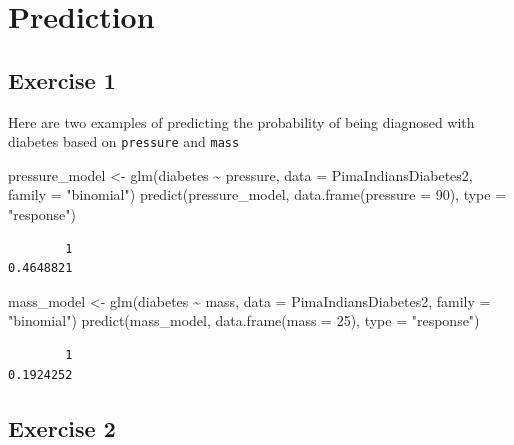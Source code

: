 \documentclass[
  letterpaper,
  DIV=11,
  numbers=noendperiod]{scrreprt}
\newenvironment{Shaded}{\begin{snugshade}}{\end{snugshade}}
\newcommand{\AttributeTok}[1]{\textcolor[rgb]{0.40,0.45,0.13}{#1}}
\newcommand{\DecValTok}[1]{\textcolor[rgb]{0.68,0.00,0.00}{#1}}
\newcommand{\FunctionTok}[1]{\textcolor[rgb]{0.28,0.35,0.67}{#1}}
\newcommand{\NormalTok}[1]{\textcolor[rgb]{0.00,0.23,0.31}{#1}}
\newcommand{\OtherTok}[1]{\textcolor[rgb]{0.00,0.23,0.31}{#1}}
\newcommand{\SpecialCharTok}[1]{\textcolor[rgb]{0.37,0.37,0.37}{#1}}
\newcommand{\StringTok}[1]{\textcolor[rgb]{0.13,0.47,0.30}{#1}}
\begin{document}
\section{Prediction}\label{prediction-4}

\subsection{Exercise 1}\label{exercise-1-33}

Here are two examples of predicting the probability of being diagnosed
with diabetes based on \texttt{pressure} and \texttt{mass}

\begin{Shaded}
\begin{Highlighting}[]
\NormalTok{pressure\_model }\OtherTok{\textless{}{-}} \FunctionTok{glm}\NormalTok{(diabetes }\SpecialCharTok{\textasciitilde{}}\NormalTok{ pressure, }\AttributeTok{data =}\NormalTok{ PimaIndiansDiabetes2, }\AttributeTok{family =} \StringTok{"binomial"}\NormalTok{)}
\FunctionTok{predict}\NormalTok{(pressure\_model, }\FunctionTok{data.frame}\NormalTok{(}\AttributeTok{pressure =} \DecValTok{90}\NormalTok{), }\AttributeTok{type =} \StringTok{"response"}\NormalTok{)}
\end{Highlighting}
\end{Shaded}

\begin{verbatim}
        1 
0.4648821 
\end{verbatim}

\begin{Shaded}
\begin{Highlighting}[]
\NormalTok{mass\_model }\OtherTok{\textless{}{-}} \FunctionTok{glm}\NormalTok{(diabetes }\SpecialCharTok{\textasciitilde{}}\NormalTok{ mass, }\AttributeTok{data =}\NormalTok{ PimaIndiansDiabetes2, }\AttributeTok{family =} \StringTok{"binomial"}\NormalTok{)}
\FunctionTok{predict}\NormalTok{(mass\_model, }\FunctionTok{data.frame}\NormalTok{(}\AttributeTok{mass =} \DecValTok{25}\NormalTok{), }\AttributeTok{type =} \StringTok{"response"}\NormalTok{)}
\end{Highlighting}
\end{Shaded}

\begin{verbatim}
        1 
0.1924252 
\end{verbatim}

\subsection{Exercise 2}\label{exercise-2-31}
\end{document}
